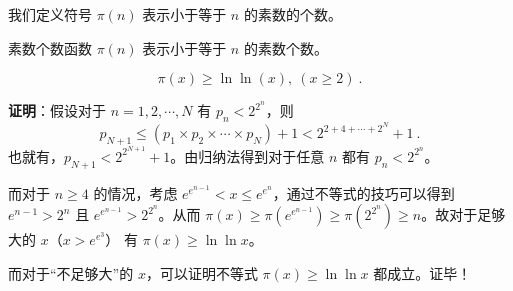 我们定义符号 $\pi(n)$ 表示小于等于 $n$ 的素数的个数。
\begin{definition}{素数个数函数}
$\pi(n)$ 表示小于等于 $n$ 的素数个数。
\end{definition}

\begin{theorem}{}
\begin{equation}
\pi(x) \ge \ln \ln (x), ~ (x \ge 2) ~.
\end{equation}
\end{theorem}
\textbf{证明}：假设对于 $n = 1, 2, \cdots, N$ 有 $p_n < 2^{2^n}$，则
\begin{equation}
p_{N+1} \leq (p_{1} \times p_2 \times \cdots \times p_N) + 1 < 2^{2+4+\cdots+2^N}+1 ~.
\end{equation}
也就有，$p_{N+1} < 2^{2^{N+1}}+1 $。由归纳法得到对于任意 $n$ 都有 $p_n < 2^{2^n}$。

而对于 $n \ge 4$ 的情况，考虑 $e^{e^{n-1}} <x \le e^{e^n}$，通过不等式的技巧可以得到 $e^{n-1} > 2^n$ 且 $e^{e^{n-1}} > 2^{2^n}$。从而 $\pi(x) \ge \pi(e^{e^{n-1}}) \ge \pi(2^{2^n}) \ge n$。故对于足够大的 $x$（$x > e^{e^3}$） 有 $\pi(x) \ge \ln \ln x$。

而对于“不足够大”的 $x$，可以证明不等式 $\pi(x) \ge \ln \ln x$ 都成立。证毕！

